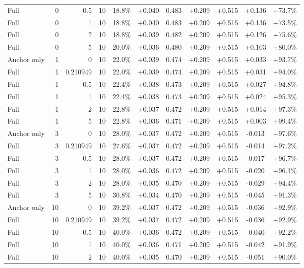 \begin{table}[htbp]
\begin{tabular}{lrrrccccccc}
Full & 0 & 0.5 & 10 & 18.8\% & +0.040 & 0.483 & +0.209 & +0.515 & +0.136 & +73.7\% \\
Full & 0 & 1 & 10 & 18.8\% & +0.040 & 0.483 & +0.209 & +0.515 & +0.136 & +73.5\% \\
Full & 0 & 2 & 10 & 18.8\% & +0.039 & 0.482 & +0.209 & +0.515 & +0.126 & +75.6\% \\
Full & 0 & 5 & 10 & 20.0\% & +0.036 & 0.480 & +0.209 & +0.515 & +0.103 & +80.0\% \\
Anchor only & 1 & 0 & 10 & 22.0\% & +0.039 & 0.474 & +0.209 & +0.515 & +0.033 & +93.7\% \\
Full & 1 & 0.210949 & 10 & 22.0\% & +0.039 & 0.474 & +0.209 & +0.515 & +0.031 & +94.0\% \\
Full & 1 & 0.5 & 10 & 22.4\% & +0.038 & 0.473 & +0.209 & +0.515 & +0.027 & +94.8\% \\
Full & 1 & 1 & 10 & 22.4\% & +0.038 & 0.473 & +0.209 & +0.515 & +0.024 & +95.3\% \\
Full & 1 & 2 & 10 & 22.8\% & +0.037 & 0.472 & +0.209 & +0.515 & +0.014 & +97.3\% \\
Full & 1 & 5 & 10 & 22.8\% & +0.036 & 0.471 & +0.209 & +0.515 & +0.003 & +99.4\% \\
Anchor only & 3 & 0 & 10 & 28.0\% & +0.037 & 0.472 & +0.209 & +0.515 & -0.013 & +97.6\% \\
Full & 3 & 0.210949 & 10 & 27.6\% & +0.037 & 0.472 & +0.209 & +0.515 & -0.014 & +97.2\% \\
Full & 3 & 0.5 & 10 & 28.0\% & +0.037 & 0.472 & +0.209 & +0.515 & -0.017 & +96.7\% \\
Full & 3 & 1 & 10 & 28.0\% & +0.036 & 0.472 & +0.209 & +0.515 & -0.020 & +96.1\% \\
Full & 3 & 2 & 10 & 28.0\% & +0.035 & 0.470 & +0.209 & +0.515 & -0.029 & +94.4\% \\
Full & 3 & 5 & 10 & 30.8\% & +0.034 & 0.470 & +0.209 & +0.515 & -0.045 & +91.3\% \\
Anchor only & 10 & 0 & 10 & 39.2\% & +0.037 & 0.472 & +0.209 & +0.515 & -0.036 & +92.9\% \\
Full & 10 & 0.210949 & 10 & 39.2\% & +0.037 & 0.472 & +0.209 & +0.515 & -0.036 & +92.9\% \\
Full & 10 & 0.5 & 10 & 40.0\% & +0.036 & 0.472 & +0.209 & +0.515 & -0.040 & +92.2\% \\
Full & 10 & 1 & 10 & 40.0\% & +0.036 & 0.471 & +0.209 & +0.515 & -0.042 & +91.9\% \\
Full & 10 & 2 & 10 & 40.0\% & +0.035 & 0.470 & +0.209 & +0.515 & -0.051 & +90.0\% \\

\end{tabular}
\end{table}
